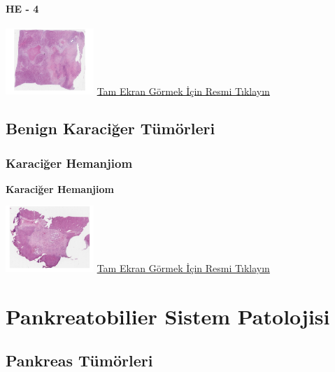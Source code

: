 \documentclass[
  letterpaper,
  DIV=11,
  numbers=noendperiod]{scrreprt}
\begin{document}
\hypertarget{he---4-1}{%
\subsection{HE - 4}\label{he---4-1}}

\href{https://images.patolojiatlasi.com/fibrolamellar-hepatocellular-carcinoma/HE4.html}{\includegraphics[width=0.25\textwidth,height=\textheight]{./screenshots/thumbnail_fibrolamellar-hepatocellular-carcinoma-4.png}}
\href{https://images.patolojiatlasi.com/fibrolamellar-hepatocellular-carcinoma/HE4.html}{Tam
Ekran Görmek İçin Resmi Tıklayın}

\hypertarget{sec-benign-karaciger-tumorleri}{%
\chapter{Benign Karaciğer
Tümörleri}\label{sec-benign-karaciger-tumorleri}}

\hypertarget{sec-karaciger-hemanjiom}{%
\section{Karaciğer Hemanjiom}\label{sec-karaciger-hemanjiom}}

\textbf{Karaciğer Hemanjiom}

\href{https://images.patolojiatlasi.com/liver-hemangioma/HE.html}{\includegraphics[width=0.25\textwidth,height=\textheight]{./screenshots/thumbnail_liver-hemangioma.png}}
\href{https://images.patolojiatlasi.com/liver-hemangioma/HE.html}{Tam
Ekran Görmek İçin Resmi Tıklayın}

\part{Pankreatobilier Sistem Patolojisi}

\hypertarget{sec-pankreas-tumorleri}{%
\chapter{Pankreas Tümörleri}\label{sec-pankreas-tumorleri}}
\end{document}
